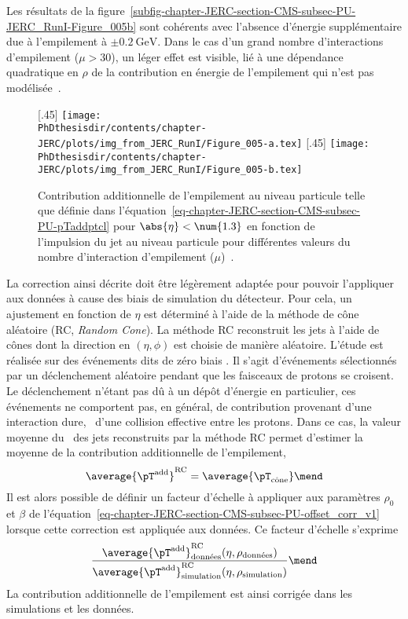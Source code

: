 Les résultats de la figure~\ref{subfig-chapter-JERC-section-CMS-subsec-PU-JERC_RunI-Figure_005b} sont cohérents avec l'absence d'énergie supplémentaire due à l'empilement à $\pm\SI{0.2}{\GeV}$. Dans le cas d'un grand nombre d'interactions d'empilement ($\mu>30$), un léger effet est visible, lié à une dépendance quadratique en $\rho$ de la contribution en énergie de l'empilement qui n'est pas modélisée~\cite{JERC_RunI}.
\begin{figure}[h]
\centering
{}[.45\textwidth]
{\texttt{[image: \\PhDthesisdir/contents/chapter-JERC/plots/img\_from\_JERC\_RunI/Figure\_005-a.tex]}}
\hfill
{}[.45\textwidth]
{\texttt{[image: \\PhDthesisdir/contents/chapter-JERC/plots/img\_from\_JERC\_RunI/Figure\_005-b.tex]}}
\caption[Contribution additionnelle de l'empilement au niveau particule.]{Contribution additionnelle de l'empilement au niveau particule telle que définie dans l'équation~\eqref{eq-chapter-JERC-section-CMS-subsec-PU-pTaddptcl} pour $\abs{\eta}<\num{1.3}$ en fonction de l'impulsion du jet au niveau particule pour différentes valeurs du nombre d'interaction d'empilement ($\mu$)~\cite{JERC_RunI}.}
\label{fig-chapter-JERC-section-CMS-subsec-PU-JERC_RunI-Figure_005}
\end{figure}
\par La correction ainsi décrite doit être légèrement adaptée pour pouvoir l'appliquer aux données à cause des biais de simulation du détecteur.
Pour cela, un ajustement en fonction de $\eta$ est déterminé à l'aide de la méthode de cône aléatoire (RC, \emph {Random Cone}). La méthode RC reconstruit les jets à l'aide de cônes dont la direction en $(\eta, \phi)$ est choisie de manière aléatoire.
L'étude est réalisée sur des événements dits de \og zéro biais \fg.
Il s'agit d'événements sélectionnés par un déclenchement aléatoire pendant que les faisceaux de protons se croisent.
Le déclenchement n'étant pas dû à un dépôt d'énergie en particulier, ces événements ne comportent pas, en général, de contribution provenant d'une interaction dure, \ie\ d'une collision effective entre les protons.
Dans ce cas, la valeur moyenne du \pT\ des jets reconstruits par la méthode RC permet d'estimer la moyenne de la contribution additionnelle de l'empilement, \ie
\begin{equation}
\average{\pT^\text{add}}^\text{RC} = \average{\pT_\text{cône}}
\mend
\end{equation}
Il est alors possible de définir un facteur d'échelle à appliquer aux paramètres $\rho_0$ et $\beta$ de l'équation~\eqref{eq-chapter-JERC-section-CMS-subsec-PU-offset_corr_v1} lorsque cette correction est appliquée aux données. Ce facteur d'échelle s'exprime
\begin{equation}
\frac{\average{\pT^\text{add}}^\text{RC}_\text{données}(\eta, \rho_\text{données})}{\average{\pT^\text{add}}^\text{RC}_\text{simulation}(\eta, \rho_\text{simulation})}
\mend
\end{equation}
La contribution additionnelle de l'empilement est ainsi corrigée dans les simulations et les données.
